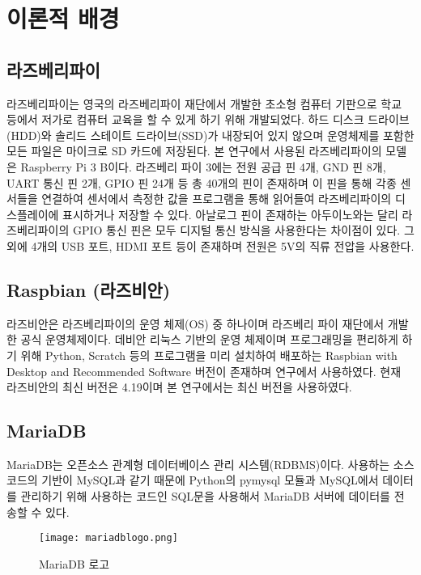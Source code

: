 \section{이론적 배경}

\subsection{라즈베리파이}

라즈베리파이는 영국의 라즈베리파이 재단에서 개발한 초소형 컴퓨터 기판으로 학교 등에서 저가로 컴퓨터 교육을 할 수 있게 하기 위해 개발되었다. 하드 디스크 드라이브(HDD)와 솔리드 스테이트 드라이브(SSD)가 내장되어 있지 않으며 운영체제를 포함한 모든 파일은 마이크로 SD 카드에 저장된다. 본 연구에서 사용된 라즈베리파이의 모델은 Raspberry Pi 3 B이다. 라즈베리 파이 3에는 전원 공급 핀 4개, GND 핀 8개, UART 통신 핀 2개, GPIO 핀 24개 등 총 40개의 핀이 존재하며 이 핀을 통해 각종 센서들을 연결하여 센서에서 측정한 값을 프로그램을 통해 읽어들여 라즈베리파이의 디스플레이에 표시하거나 저장할 수 있다. 아날로그 핀이 존재하는 아두이노와는 달리 라즈베리파이의 GPIO 통신 핀은 모두 디지털 통신 방식을 사용한다는 차이점이 있다. 그 외에 4개의 USB 포트, HDMI 포트 등이 존재하며 전원은 5V의 직류 전압을 사용한다.

\subsection{Raspbian (라즈비안)}
라즈비안은 라즈베리파이의 운영 체제(OS) 중 하나이며 라즈베리 파이 재단에서 개발한 공식 운영체제이다. 데비안 리눅스 기반의 운영 체제이며 프로그래밍을 편리하게 하기 위해 Python, Scratch 등의 프로그램을 미리 설치하여 배포하는 Raspbian with Desktop and Recommended Software 버전이 존재하며 연구에서 사용하였다. 현재 라즈비안의 최신 버전은 4.19이며 본 연구에서는 최신 버전을 사용하였다.

\subsection{MariaDB}
MariaDB는 오픈소스 관계형 데이터베이스 관리 시스템(RDBMS)이다. 사용하는 소스 코드의 기반이 MySQL과 같기 때문에 Python의 pymysql 모듈과 MySQL에서 데이터를 관리하기 위해 사용하는 코드인 SQL문을 사용해서 MariaDB 서버에 데이터를 전송할 수 있다.

\begin{figure}[htbp]
	\centering
	\texttt{[image: mariadblogo.png]}
	\caption{MariaDB 로고}
	\label{MariaDB}
\end{figure}

